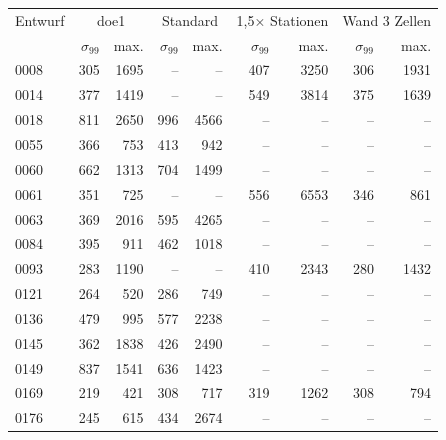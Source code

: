 \begin{tabular}{@{}lrrrrrrrr@{}}\toprule
Entwurf & \multicolumn{2}{c}{doe1} & \multicolumn{2}{c}{Standard} & \multicolumn{2}{c}{1,5× Stationen} & \multicolumn{2}{c}{Wand 3 Zellen} \\
  & $\sigma_{99}$ & max. & $\sigma_{99}$ & max. & $\sigma_{99}$ & max. & $\sigma_{99}$ & max. \\\midrule
0008 & \num{305} & \num{1695} & -- & -- & \num{407} & \num{3250} & \num{306} & \num{1931} \\
0014 & \num{377} & \num{1419} & -- & -- & \num{549} & \num{3814} & \num{375} & \num{1639} \\
0018 & \num{811} & \num{2650} & \num{996} & \num{4566} & -- & -- & -- & -- \\
0055 & \num{366} & \num{753} & \num{413} & \num{942} & -- & -- & -- & -- \\
0060 & \num{662} & \num{1313} & \num{704} & \num{1499} & -- & -- & -- & -- \\
0061 & \num{351} & \num{725} & -- & -- & \num{556} & \num{6553} & \num{346} & \num{861} \\
0063 & \num{369} & \num{2016} & \num{595} & \num{4265} & -- & -- & -- & -- \\
0084 & \num{395} & \num{911} & \num{462} & \num{1018} & -- & -- & -- & -- \\
0093 & \num{283} & \num{1190} & -- & -- & \num{410} & \num{2343} & \num{280} & \num{1432} \\
0121 & \num{264} & \num{520} & \num{286} & \num{749} & -- & -- & -- & -- \\
0136 & \num{479} & \num{995} & \num{577} & \num{2238} & -- & -- & -- & -- \\
0145 & \num{362} & \num{1838} & \num{426} & \num{2490} & -- & -- & -- & -- \\
0149 & \num{837} & \num{1541} & \num{636} & \num{1423} & -- & -- & -- & -- \\
0169 & \num{219} & \num{421} & \num{308} & \num{717} & \num{319} & \num{1262} & \num{308} & \num{794} \\
0176 & \num{245} & \num{615} & \num{434} & \num{2674} & -- & -- & -- & -- \\
\bottomrule\end{tabular}
